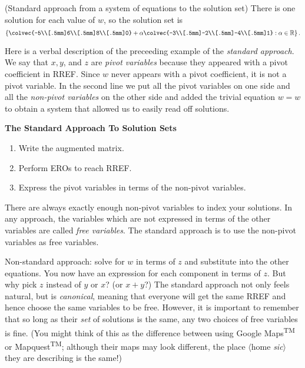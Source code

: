 \begin{example}{(Standard approach  from a system of equations to the solution set)}
There is one solution for each value of $w$, so the solution set is 
\[
\left\{    \colvec{-5\\[.5mm]6\\[.5mm]8\\[.5mm]0} 
+ 
\alpha \colvec{-3\\[.5mm]-2\\[.5mm]-4\\[.5mm]1} : \alpha \in \mathbb{R} \right\}.
\]
\end{example}
Here is a verbal description of the preceeding example of the \hypertarget{standard approach}{{\itshape standard approach}}. We say that $x,y$, and $z$ are {\itshape pivot variables} because they appeared with a  pivot coefficient in RREF. 
Since $w$ never appears with a pivot  coefficient, 
 it is not a pivot variable. %
In the second line we put all the pivot variables on one side 
and all the {\itshape non-pivot variables} on the other side and added the trivial equation $w=w$ to obtain a system that allowed us to easily read off solutions.

\begin{center}
{\Large{\bf The Standard Approach To Solution Sets}}
\end{center}
\begin{enumerate}
\item Write the augmented matrix.
\item Perform EROs to reach RREF.
\item Express the pivot variables in terms of the non-pivot variables. 
\end{enumerate}
There are always exactly enough non-pivot variables to index your solutions. 
In any approach, the variables which are not expressed in terms of the other variables are called  {\itshape free variables}. The standard approach is to use the non-pivot variables as free variables.

Non-standard approach: solve for $w$ in terms of $z$ and substitute into the other equations. You now have an expression for each component in terms of $z$. But why pick $z$ instead of $y$ or $x$? (or $x+y$?) The standard approach not only feels natural, 
but is {\itshape canonical}, meaning that everyone will get the same RREF and hence choose the same variables to be free.
However, it is important to remember that so long as their {\itshape set} of solutions is the same, any two choices of free variables is fine.
(You might think of this as the difference between using Google Maps\textsuperscript{\sffamily TM} or Mapquest\textsuperscript{\sffamily TM}; although their maps may look different, 
the place 
$\langle$home {\itshape sic}$\rangle$ 
they are describing is the same!)



